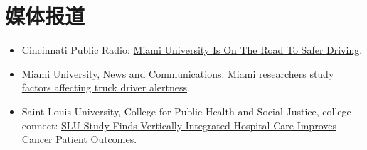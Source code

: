 \documentclass[11pt, a4paper]{article}
\newcommand{\years}[1]{\marginnote{\scriptsize #1}}
\begin{document}
	\section*{媒体报道}
	\begin{itemize}[leftmargin=0ex,itemsep=0ex, label={}]
		\item \years{2019}Cincinnati Public Radio: \href{https://www.wvxu.org/post/miami-university-road-safer-driving#stream/0}{Miami University Is On The Road To Safer Driving}. 
		
		\item \years{2019}Miami University, News and Communications: \href{https://miamioh.edu/news/top-stories/2019/06/fatigue-study.html}{Miami researchers study factors affecting truck driver alertness}.
		
		\item \years{2019} Saint Louis University, College for Public Health and Social Justice, college connect:  \href{https://gallery.mailchimp.com/a3e4404ac622b2beb4b205f61/files/4cc71d2d-bdc4-4035-8ba6-b98ae42bedc3/SLU_Study_Finds_Vertically_Integrated_Hospital_Care_Improves_Cancer_Patient_Outcomes.pdf?utm_source=Unknown+List&utm_campaign=8d37abbd00-EMAIL_CAMPAIGN_2019_01_22_08_06&utm_medium=email&utm_term=0_-8d37abbd00-}{SLU Study Finds Vertically Integrated Hospital Care Improves Cancer Patient Outcomes}.
	\end{itemize}
	
	
\end{document}
